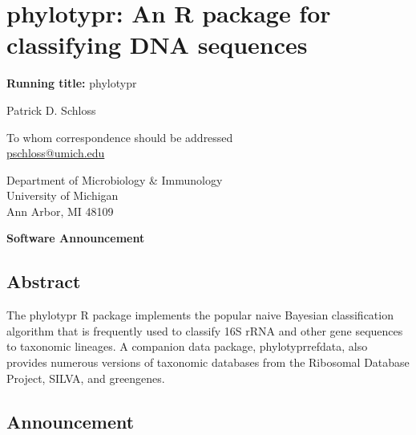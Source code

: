 \documentclass[
  11pt,
]{article}
\author{}
\date{}
\begin{document}
\raggedright

\section{phylotypr: An R package for classifying DNA
sequences}\label{phylotypr-an-r-package-for-classifying-dna-sequences}

\vspace{20mm}

\textbf{Running title:} phylotypr

\vspace{20mm}

Patrick D. Schloss\textsuperscript{\textdagger}

\vspace{25mm}

\textdagger To whom correspondence should be addressed\\
\href{mailto:pschloss@umich.edu}{pschloss@umich.edu}

\vspace{10mm}

Department of Microbiology \& Immunology\\
University of Michigan\\
Ann Arbor, MI 48109

\vspace{20mm}

\textbf{Software Announcement}

\newpage

\subsection{Abstract}\label{abstract}

The phylotypr R package implements the popular naive Bayesian
classification algorithm that is frequently used to classify 16S rRNA
and other gene sequences to taxonomic lineages. A companion data
package, phylotyprrefdata, also provides numerous versions of taxonomic
databases from the Ribosomal Database Project, SILVA, and greengenes.

\newpage

\subsection{Announcement}\label{announcement}
\end{document}
